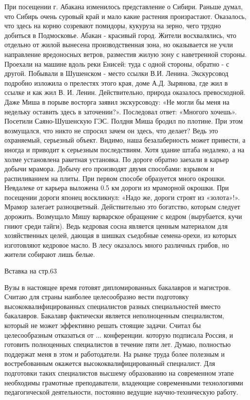 При посещении г. Абакана изменилось представление о Сибири. Раньше думал, что Сибирь очень суровый край и мало какие растения произрастают. Оказалось, что здесь на корню созревают помидоры, кукуруза на зерно, чего трудно добиться в Подмосковье. Абакан - красивый город.  Жители восхвалялись, что отдельно от жилой вынесена производственная зона, но оказывается не учли направление вредоносных ветров, разместив жилую зону с наветренной стороны. Проехали на машине вдоль реки Енисей: туда с одной стороны, обратно - с другой. Побывали в Шушенском - место ссылки В.И. Ленина. Экскурсовод подробно изложила о прелестях этого края, доме А.Д. Зырянова, где жил в ссылке и как жил В. И. Ленин. Действительно, природа оказалось превосходной. Даже Миша в порыве восторга заявил экскурсоводу: «Не могли бы меня на недельку оставить здесь в заточении?». Последовал ответ: «Многого хочешь». Посетили Саяно-Шушенскую ГЭС. Полдня Миша бродил по плотине. При этом возмущался, что никто не спросил зачем он здесь, что делает? Ведь это охраняемый, серьезный объект. Видимо, наша безалаберность может привести, а иногда и приводит к серьезным последствиям. Хотя здание штаба недалеко, а на холме установлена ракетная установка. По дороге обратно заехали в карьер добычи мрамора. Добычу его производят двумя способами: взрывом и распиливанием на плиты. При первом способе образуется много окрошки. Невдалеке от карьера выложена 0.5 км дороги из мраморной окрошки. При посещении дороги японец воскликнул: «Надо же, дороги строят из «золота»!». Мрамор залегает разноцветный. Действительно это богатство, которым следует дорожить. Возмущало Мишу варварское обращение с кедром (вырубается, кучи гниют среди тайги). Ведь кедровая сосна является ценным материалом для хозяйственных целей, дающая в шишках съедобные семена-орехи, из которых изготовляют кедровое масло. В лесу оказалось много различных грибов, но жители собирают лишь белые.

Вставка на стр.63

Вузы в настоящее время готовят дипломированных бакалавров и магистров. Считаю для страны наиболее целесообразно вести подготовку высококвалифицированных специалистов разных специальностей вместо бакалавров. Бакалавр фактически является неполноценным специалистом, который не может эффективно решать стоящие задачи. Считал бы целесообразным отказаться от ... конференции. которую подписала Россия, и готовить полноценных специалистов в течение пяти лет. Думаю, полностью поддержат меня в этом и работодатели. На рынке труда более полезным и востребованным окажется высококвалифицированный специалист. Для подготовки таких специалистов высшему образованию на современном этапе необходимы грамотные преподаватели, владеющие современными технологиями педагогической деятельности, постоянно ведущие научно-техническую работу.

